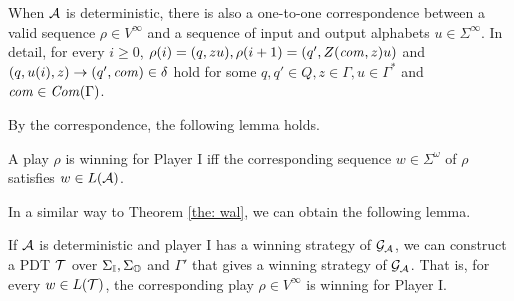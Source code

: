 When ${\cal A}$ is deterministic,
there is also a one-to-one correspondence between
a valid sequence $\rho\in V^\infty$ and a sequence of input and output alphabets $u\in\Sigma^\infty$.
In detail, for every $i\geq 0$, $\rho(i) = (q, zu), \rho(i+1) = (q', Z(\mathit{com},z)u)$ and $(q, u(i), z) \to (q', \mathit{com})\in\delta$ hold for some $q, q'\in Q, z\in\Gamma, u\in\Gamma^*$ and $\mathit{com}\in \mathit{Com}(\Gamma)$.

By the correspondence, the following lemma holds.
\begin{lemma}
\label{lem: 1}
A play $\rho$ is winning for Player I iff
the corresponding sequence $w\in \Sigma^\omega$ of $\rho$
satisfies $w\in L({\cal A})$.
\end{lemma}

In a similar way to Theorem \ref{the: wal},
we can obtain the following lemma.
\begin{lemma}
\label{lem: 2}
If ${\cal A}$ is deterministic and player I has a winning strategy of ${\cal G}_{\cal A}$,
we can construct a PDT ${\cal T}$ over $\Sigma_{\mathbb{I}}, \Sigma_{\mathbb{O}}$ and $\Gamma'$ that gives a winning strategy of ${\cal G}_{\cal A}$.
That is, for every $w\in L({\cal T})$, the corresponding play $\rho\in V^\infty$ is winning for Player I.
\end{lemma}
